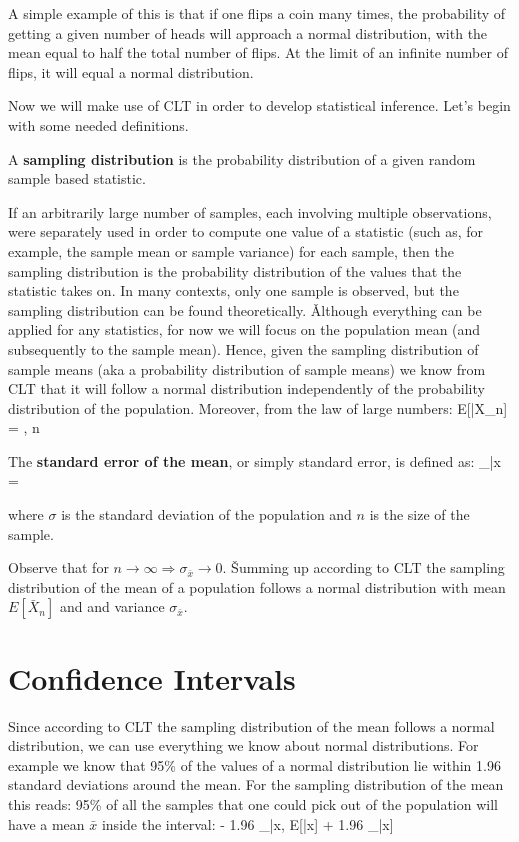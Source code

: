 \be
A simple example of this is that if one flips a coin many times, the probability of getting a given number of heads
will approach a normal distribution, with the mean equal to half the total number of flips. At the limit of an
infinite number of flips, it will equal a normal distribution.
\ee

Now we will make use of CLT in order to develop statistical inference. Let's begin with some needed definitions.

A \textbf{sampling distribution} is the probability distribution of a given random sample based statistic.
\ed

If an arbitrarily large number of samples, each involving multiple observations, were separately used in order to
compute one value of a statistic (such as, for example, the sample mean or sample variance) for each sample, then
the sampling distribution is the probability distribution of the values that the statistic takes on. In many
contexts, only one sample is observed, but the sampling distribution can be found theoretically. \v

Although everything can be applied for any statistics, for now we will focus on the population mean (and
subsequently to the sample mean). Hence, given the sampling distribution of sample means (aka a probability
distribution of sample means) we know from CLT that it will follow a normal distribution independently of the
probability distribution of the population. Moreover, from the law of large numbers:
\bse
E[\bar{X}_{n}] = \mu, \quad {} n \to \infty
\ese

The \textbf{standard error of the mean}, or simply standard error, is defined as:
\bse
\sigma_{\bar {x}} = 
\ese

where $\sigma$ is the standard deviation of the population and $n$ is the size of the sample.
\ed

Observe that for $n \to \infty \Rightarrow \sigma_{\bar {x}} \to 0$. \v

Summing up according to CLT the sampling distribution of the mean of a population follows a normal distribution with
mean $E[\bar{X}_{n}]$ and and variance $\sigma_{\bar {x}}$.

\section{Confidence Intervals}

Since according to CLT the sampling distribution of the mean follows a normal distribution, we can use everything we
know about normal distributions. For example we know that 95\% of the values of a normal distribution lie within
1.96 standard deviations around the mean. For the sampling distribution of the mean this reads: 95\% of all the
samples that one could pick out of the population will have a mean $\bar{x}$ inside the interval:
\bse
[E[\bar{x}] - 1.96 \sigma_{\bar{x}}, \: E[\bar{x}] + 1.96 \sigma_{\bar{x}}]
\ese

